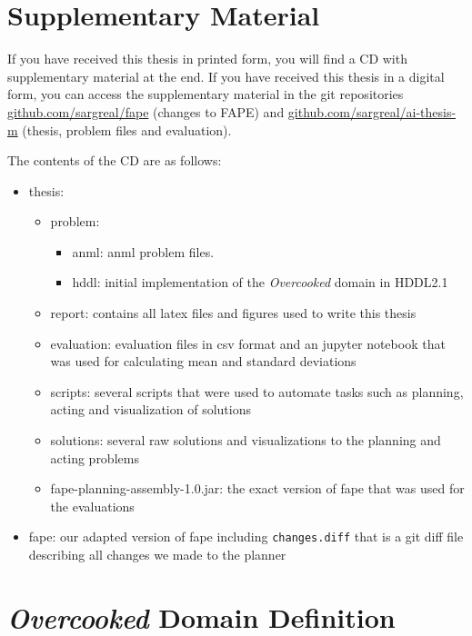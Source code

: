 %
\appendix

\section{Supplementary Material}

If you have received this thesis in printed form, you will find a CD with supplementary material at the end.
If you have received this thesis in a digital form, you can access the supplementary material in the git repositories \href{https://github.com/sargreal/fape}{github.com/sargreal/fape} (changes to \ac{FAPE}) and \href{https://github.com/sargreal/ai-thesis-m}{github.com/sargreal/ai-thesis-m} (thesis, problem files and evaluation).

The contents of the CD are as follows:
\begin{itemize}
  \item thesis: 
  \begin{itemize}
    \item problem: 
    \begin{itemize}
      \item anml: anml problem files.
      \item hddl: initial implementation of the \textit{Overcooked} domain in HDDL2.1
    \end{itemize}
    \item report: contains all latex files and figures used to write this thesis
    \item evaluation: evaluation files in csv format and an jupyter notebook that was used for calculating mean and standard deviations
    \item scripts: several scripts that were used to automate tasks such as planning, acting and visualization of solutions
    \item solutions: several raw solutions and visualizations to the planning and acting problems
    \item fape-planning-assembly-1.0.jar: the exact version of fape that was used for the evaluations
  \end{itemize}
  \item fape: our adapted version of fape including \verb|changes.diff| that is a git diff file describing all changes we made to the planner
\end{itemize}

\section{\textit{Overcooked} Domain Definition}
\label{app:domain}

